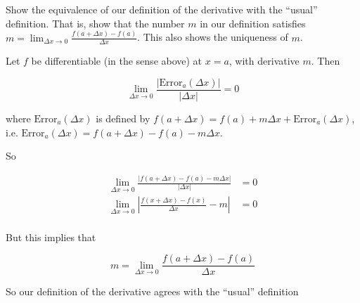 \documentclass{ximera}
\begin{document}
Show the equivalence of our definition of the derivative with the ``usual'' definition.  That is, show that the number $m$ in our definition satisfies
$m = \lim_{\Delta x \to 0}\frac{f(a+\Delta x)-f(a)}{\Delta x}$.  This also shows the uniqueness of $m$.

\begin{free-response}
  Let $f$ be differentiable (in the sense above) at $x=a$, with derivative $m$.  Then 
  
  \[ \lim_{\Delta x \to 0} \frac{\left|\text{Error}_a(\Delta x)\right|}{\left|\Delta x\right|} = 0 \]
  
  where $\text{Error}_a(\Delta x)$ is defined by $f(a+\Delta x) = f(a) + m\Delta x + \text{Error}_a(\Delta x)$, i.e. $\text{Error}_a(\Delta x) = f(a+\Delta x) - f(a) -m\Delta x$.
  
  So 
  
  \begin{align*}
    \lim_{\Delta x \to 0} \frac{\left|f(a+\Delta x) - f(a) -m\Delta x\right|}{\left|\Delta x\right|} &= 0\\
    \lim_{\Delta x \to 0} \left| \frac{f(x+\Delta x) -f(x)}{\Delta x} - m\right| &= 0\\
  \end{align*}
  
  But this implies that
  
  \[m = \lim_{\Delta x \to 0}\frac{f(a+\Delta x)-f(a)}{\Delta x}\]
  
  So our definition of the derivative agrees with the  ``usual'' definition
  
\end{free-response}
\end{document}
